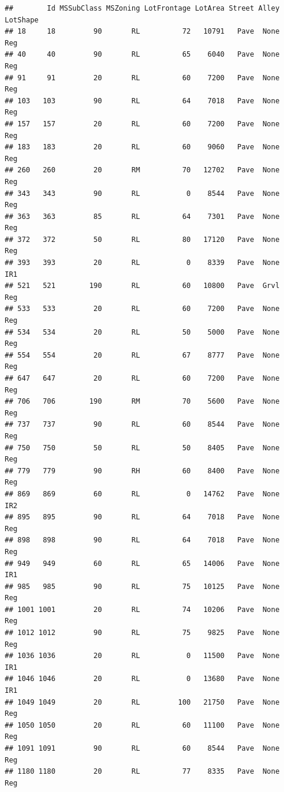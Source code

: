 \documentclass[]{article}
\begin{document}
\begin{verbatim}
##        Id MSSubClass MSZoning LotFrontage LotArea Street Alley LotShape
## 18     18         90       RL          72   10791   Pave  None      Reg
## 40     40         90       RL          65    6040   Pave  None      Reg
## 91     91         20       RL          60    7200   Pave  None      Reg
## 103   103         90       RL          64    7018   Pave  None      Reg
## 157   157         20       RL          60    7200   Pave  None      Reg
## 183   183         20       RL          60    9060   Pave  None      Reg
## 260   260         20       RM          70   12702   Pave  None      Reg
## 343   343         90       RL           0    8544   Pave  None      Reg
## 363   363         85       RL          64    7301   Pave  None      Reg
## 372   372         50       RL          80   17120   Pave  None      Reg
## 393   393         20       RL           0    8339   Pave  None      IR1
## 521   521        190       RL          60   10800   Pave  Grvl      Reg
## 533   533         20       RL          60    7200   Pave  None      Reg
## 534   534         20       RL          50    5000   Pave  None      Reg
## 554   554         20       RL          67    8777   Pave  None      Reg
## 647   647         20       RL          60    7200   Pave  None      Reg
## 706   706        190       RM          70    5600   Pave  None      Reg
## 737   737         90       RL          60    8544   Pave  None      Reg
## 750   750         50       RL          50    8405   Pave  None      Reg
## 779   779         90       RH          60    8400   Pave  None      Reg
## 869   869         60       RL           0   14762   Pave  None      IR2
## 895   895         90       RL          64    7018   Pave  None      Reg
## 898   898         90       RL          64    7018   Pave  None      Reg
## 949   949         60       RL          65   14006   Pave  None      IR1
## 985   985         90       RL          75   10125   Pave  None      Reg
## 1001 1001         20       RL          74   10206   Pave  None      Reg
## 1012 1012         90       RL          75    9825   Pave  None      Reg
## 1036 1036         20       RL           0   11500   Pave  None      IR1
## 1046 1046         20       RL           0   13680   Pave  None      IR1
## 1049 1049         20       RL         100   21750   Pave  None      Reg
## 1050 1050         20       RL          60   11100   Pave  None      Reg
## 1091 1091         90       RL          60    8544   Pave  None      Reg
## 1180 1180         20       RL          77    8335   Pave  None      Reg

\end{verbatim}
\end{document}

